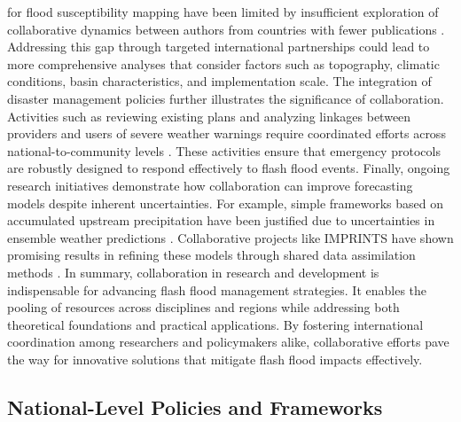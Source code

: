 for flood susceptibility mapping have been limited by insufficient exploration of collaborative dynamics between authors from countries with fewer publications \citep{Hinge2024}. Addressing this gap through targeted international partnerships could lead to more comprehensive analyses that consider factors such as topography, climatic conditions, basin characteristics, and implementation scale. The integration of disaster management policies further illustrates the significance of collaboration. Activities such as reviewing existing plans and analyzing linkages between providers and users of severe weather warnings require coordinated efforts across national-to-community levels \citep{Jubach2016}. These activities ensure that emergency protocols are robustly designed to respond effectively to flash flood events. Finally, ongoing research initiatives demonstrate how collaboration can improve forecasting models despite inherent uncertainties. For example, simple frameworks based on accumulated upstream precipitation have been justified due to uncertainties in ensemble weather predictions \citep{Alfieri2015}. Collaborative projects like IMPRINTS have shown promising results in refining these models through shared data assimilation methods \citep{Naulin2013}. In summary, collaboration in research and development is indispensable for advancing flash flood management strategies. It enables the pooling of resources across disciplines and regions while addressing both theoretical foundations and practical applications. By fostering international coordination among researchers and policymakers alike, collaborative efforts pave the way for innovative solutions that mitigate flash flood impacts effectively.

\subsection{National-Level Policies and Frameworks}

